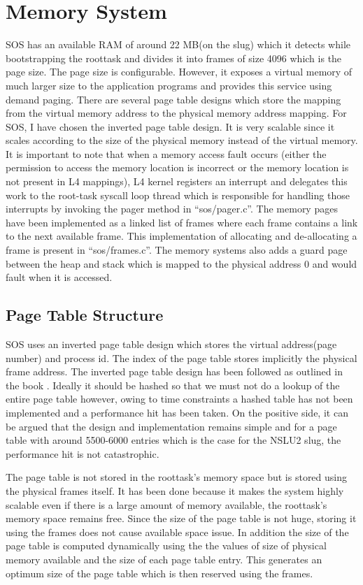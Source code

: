 \documentclass[a4paper, 11pt]{article}
\begin{document}
\section{Memory System}
SOS has an available RAM of around 22 MB(on the slug) which it detects
while bootstrapping the roottask and divides it into frames
of size 4096 which is the page size. The page size is configurable. However,
it exposes a virtual memory of much larger size to the application
programs and provides this service using demand paging. There are
several page table designs which store the mapping from the virtual
memory address to the physical memory address mapping. For SOS, I have
chosen the inverted page table design. It is very scalable since it
scales according to the size of the physical memory instead of the
virtual memory. It is important to note that when a memory access
fault occurs (either the permission to access the memory location is
incorrect or the memory location is not present in L4 mappings), L4
kernel registers an interrupt and delegates this work to the root-task
syscall loop thread which is responsible for handling those interrupts
by invoking the pager method in ``sos/pager.c''. The memory pages have
been implemented as a linked list of frames where each frame contains
a link to the next available frame. This implementation of allocating
and de-allocating a frame is present in ``sos/frames.c''. The memory
systems also adds a guard page between the heap and stack which is
mapped to the physical address 0 and would fault when it is accessed.

\subsection{Page Table Structure}
SOS uses an inverted page table design which stores the virtual
address(page number) and process id. The index of the page table
stores implicitly the physical frame address. The inverted page table
design has been followed as outlined in the book
\cite[Page~395]{tanenbaum}.  Ideally it should be
hashed so that we must not do a lookup of the entire page table
however, owing to time constraints a hashed table has not been
implemented and a performance hit has been taken. On the positive
side, it can be argued that the design and implementation remains
simple and for a page table with around 5500-6000 entries which is the
case for the NSLU2 slug, the performance hit is not catastrophic.

The page table is not stored in the roottask's memory space but is
stored using the physical frames itself. It has been done because it
makes the system highly scalable even if there is a large amount of
memory available, the roottask's memory space remains free. Since the
size of the page table is not huge, storing it using the frames does
not cause available space issue. In addition the size of the page
table is computed dynamically using the the values of size of physical
memory available and the size of each page table entry. This generates
an optimum size of the page table which is then reserved using the
frames. 
\end{document}
